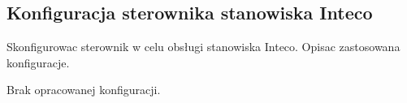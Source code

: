 \subsection{Konfiguracja sterownika stanowiska Inteco}
\label{lab:zad7}


Skonfigurowac sterownik w celu obsługi stanowiska Inteco. Opisac zastosowana konfiguracje.

Brak opracowanej konfiguracji.

\newpage
